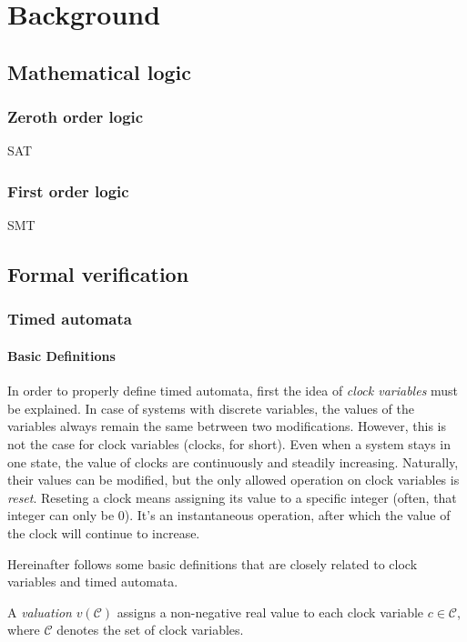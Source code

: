 \chapter{Background}
\label{chap:background}



\section{Mathematical logic}

\subsection{Zeroth order logic}
SAT
\subsection{First order logic}
SMT

\section{Formal verification}
\subsection{Timed automata}

\subsubsection{Basic Definitions}
In order to properly define timed automata, first the idea of \emph{clock variables} must be explained. In case of systems with discrete variables, the values of the variables always remain the same betrween two modifications. However, this is not the case for clock variables (clocks, for short). Even when a system stays in one state, the value of clocks are continuously and steadily increasing. Naturally, their values can be modified, but the only allowed operation on clock variables is \emph{reset}. Reseting a clock means assigning its value to a specific integer (often, that integer can only be 0). It's an instantaneous operation, after which the value of the clock will continue to increase.

Hereinafter follows some basic definitions that are closely related to clock variables and timed automata. 

\begin{dfn}
	A \emph{valuation} $v(\mathcal{C})$ assigns a non-negative real value
	to each clock variable $c \in \mathcal{C}$, where $\mathcal{C}$ denotes the set of clock
	variables.
\end{dfn}

